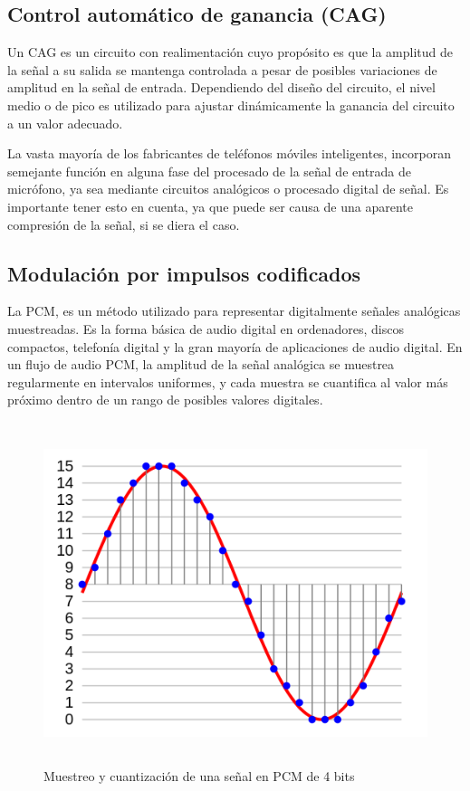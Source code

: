 \subsection{Control automático de ganancia (CAG)}
Un \ac{CAG} es un circuito con realimentación cuyo propósito es que la amplitud de la señal a su salida se mantenga controlada a pesar de posibles variaciones de amplitud en la señal de entrada. Dependiendo del diseño del circuito, el nivel medio o de pico es utilizado para ajustar dinámicamente la ganancia del circuito a un valor adecuado.

La vasta mayoría de los fabricantes de teléfonos móviles inteligentes, incorporan semejante función en alguna fase del procesado de la señal de entrada de micrófono, ya sea mediante circuitos analógicos o procesado digital de señal. Es importante tener esto en cuenta, ya que puede ser causa de una aparente compresión de la señal, si se diera el caso. 

\subsection{Modulación por impulsos codificados}

La \ac{PCM}, es un método utilizado para representar digitalmente señales analógicas muestreadas. Es la forma básica de audio digital en ordenadores, discos compactos, telefonía digital y la gran mayoría de aplicaciones de audio digital. En un flujo de audio \ac{PCM}, la amplitud de la señal analógica se muestrea regularmente en intervalos uniformes, y cada muestra se cuantifica al valor más próximo dentro de un rango de posibles valores digitales.

\begin{figure}[H] \centering
    \includegraphics[height=10cm]{graphs/Pcm.png} \caption{Muestreo y cuantización de una señal en PCM de 4 bits}\label{fig:diagrama:PCM}
\end{figure}

